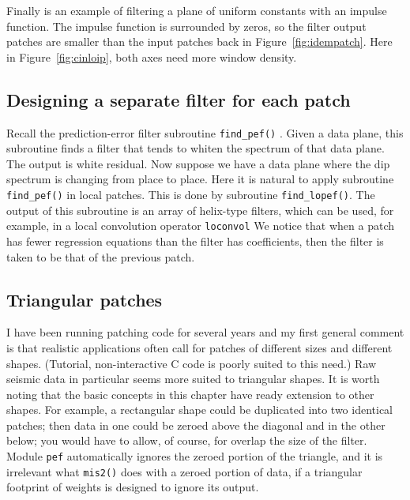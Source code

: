 \par
Finally is an example
of filtering a plane of uniform constants with an impulse function.
The impulse function is surrounded by zeros,
so the filter output patches are smaller than 
the input patches back in Figure~\ref{fig:idempatch}.
Here in Figure~\ref{fig:cinloip},
both axes need more window density.


\subsection{Designing a separate filter for each patch}
Recall the prediction-error filter subroutine 
\texttt{find\_pef()} .
Given a data plane, this subroutine finds a filter that tends
to whiten the spectrum of that data plane.
The output is white residual.
Now suppose we have a data plane where the dip spectrum
is changing from place to place.
Here it is natural to apply subroutine {\tt find\_pef()} in local patches.
This is done by subroutine \texttt{find\_lopef()}. 
The output of this subroutine is an array of helix-type filters,
which can be used, for example,
in a local convolution operator
\texttt{loconvol} %
We notice that when a patch has fewer regression equations
than the filter has coefficients, then the filter is taken
to be that of the previous patch.


\par

\subsection{Triangular patches}
I have been running patching code for several years
and my first general comment is that realistic applications
often call for patches of different sizes and different shapes.
(Tutorial, non-interactive C code is poorly suited to this need.)
Raw seismic data in particular seems more suited to triangular shapes.
It is worth noting that the basic concepts in this chapter
have ready extension to other shapes.
For example,
a rectangular shape could be duplicated into two identical patches;
then data in one could be zeroed above the diagonal
and in the other below;
you would have to allow, of course, for overlap the size of the filter.
Module \texttt{pef}  automatically ignores the zeroed portion
of the triangle,
and it is irrelevant what \texttt{mis2()} 
does with a zeroed portion of data,
if a triangular footprint of weights is designed to ignore its output.

